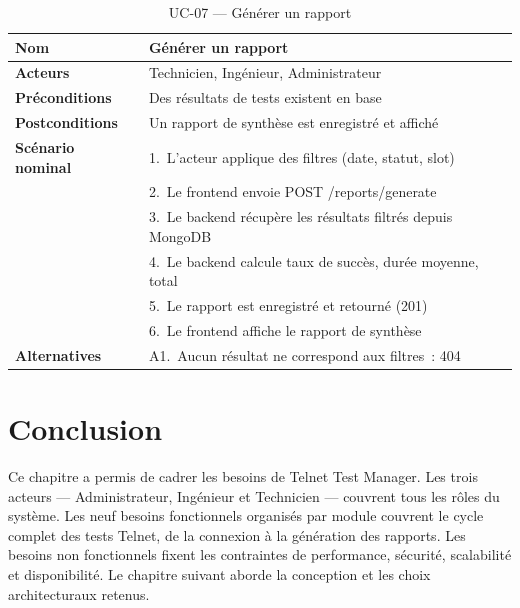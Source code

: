 \begin{table}[H]
  \centering
  \caption{UC-07 --- Générer un rapport}
  \label{tab:uc07}
  \begin{tabular}{|L{3.5cm}|L{10cm}|}
    \hline
    \textbf{Nom} & Générer un rapport \\
    \hline
    \textbf{Acteurs} & Technicien, Ingénieur, Administrateur \\
    \hline
    \textbf{Préconditions} & Des résultats de tests existent en base \\
    \hline
    \textbf{Postconditions} & Un rapport de synthèse est enregistré et affiché \\
    \hline
    \textbf{Scénario nominal} &
      1.~L'acteur applique des filtres (date, statut, slot) \\
    & 2.~Le frontend envoie POST /reports/generate \\
    & 3.~Le backend récupère les résultats filtrés depuis MongoDB \\
    & 4.~Le backend calcule taux de succès, durée moyenne, total \\
    & 5.~Le rapport est enregistré et retourné (201) \\
    & 6.~Le frontend affiche le rapport de synthèse \\
    \hline
    \textbf{Alternatives} &
      A1.~Aucun résultat ne correspond aux filtres~: 404 \\
    \hline
  \end{tabular}
\end{table}

\section{Conclusion}

Ce chapitre a permis de cadrer les besoins de Telnet Test Manager.
Les trois acteurs --- Administrateur, Ingénieur et Technicien ---
couvrent tous les rôles du système. Les neuf besoins fonctionnels
organisés par module couvrent le cycle complet des tests Telnet,
de la connexion à la génération des rapports. Les besoins non
fonctionnels fixent les contraintes de performance, sécurité,
scalabilité et disponibilité. Le chapitre suivant aborde la
conception et les choix architecturaux retenus.
